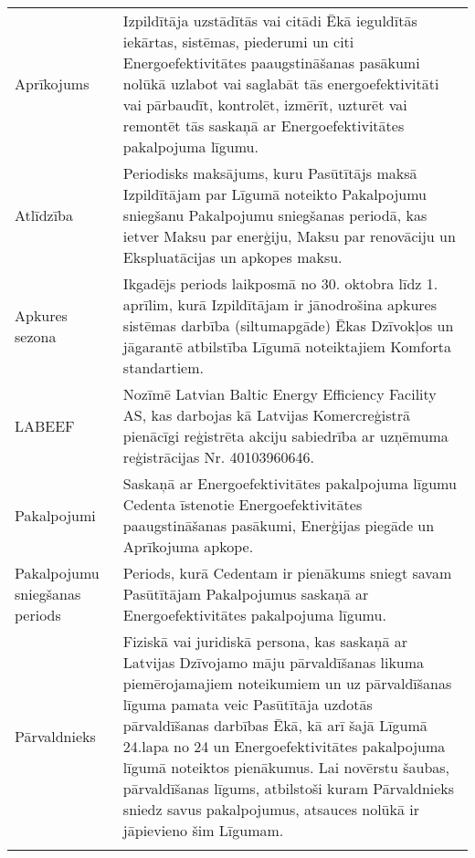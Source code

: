 \documentclass[a4paper]{article}
\begin{document}
\begin{longtabu}{|X|X[2]|}
   \hline

   Aprīkojums & Izpildītāja uzstādītās vai citādi Ēkā ieguldītās iekārtas, sistēmas, piederumi un citi Energoefektivitātes paaugstināšanas
pasākumi nolūkā uzlabot vai saglabāt tās energoefektivitāti vai pārbaudīt, kontrolēt, izmērīt, uzturēt vai remontēt tās
saskaņā ar Energoefektivitātes pakalpojuma līgumu.\\\tabucline{}

   \hline

   Atlīdzība & Periodisks maksājums, kuru Pasūtītājs maksā Izpildītājam par Līgumā noteikto Pakalpojumu sniegšanu Pakalpojumu
sniegšanas periodā, kas ietver Maksu par enerģiju, Maksu par renovāciju un Ekspluatācijas un apkopes maksu.\\\tabucline{}

   \hline

   Apkures sezona &Ikgadējs periods laikposmā no 30. oktobra līdz 1. aprīlim, kurā Izpildītājam ir jānodrošina apkures sistēmas darbība
(siltumapgāde) Ēkas Dzīvokļos un jāgarantē atbilstība Līgumā noteiktajiem Komforta standartiem.\\\tabucline{}

   \hline

   LABEEF &Nozīmē Latvian Baltic Energy Efficiency Facility AS, kas darbojas kā Latvijas Komercreģistrā pienācīgi reģistrēta akciju
sabiedrība ar uzņēmuma reģistrācijas Nr. 40103960646.\\\tabucline{}

   \hline

   Pakalpojumi&Saskaņā ar Energoefektivitātes pakalpojuma līgumu Cedenta īstenotie Energoefektivitātes paaugstināšanas pasākumi,
Enerģijas piegāde un Aprīkojuma apkope.\\\tabucline{}

   \hline

   Pakalpojumu sniegšanas periods & Periods, kurā Cedentam ir pienākums sniegt savam Pasūtītājam Pakalpojumus saskaņā ar Energoefektivitātes
pakalpojuma līgumu.\\\tabucline{}

   \hline

   Pārvaldnieks & Fiziskā vai juridiskā persona, kas saskaņā ar Latvijas Dzīvojamo māju pārvaldīšanas likuma piemērojamajiem
noteikumiem un uz pārvaldīšanas līguma pamata veic Pasūtītāja uzdotās pārvaldīšanas darbības Ēkā, kā arī šajā Līgumā
24.lapa no 24 un Energoefektivitātes pakalpojuma līgumā noteiktos pienākumus. Lai novērstu šaubas, pārvaldīšanas līgums, atbilstoši
kuram Pārvaldnieks sniedz savus pakalpojumus, atsauces nolūkā ir jāpievieno šim Līgumam.\\\tabucline{}


\end{longtabu}
\end{document}
